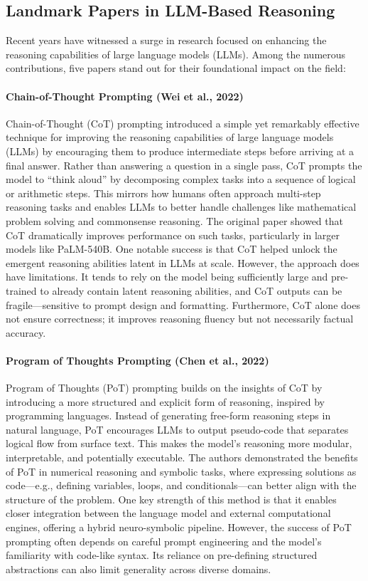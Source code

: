 \subsection{Landmark Papers in LLM-Based Reasoning}

Recent years have witnessed a surge in research focused on enhancing the reasoning capabilities of large language models (LLMs). Among the numerous contributions, five papers stand out for their foundational impact on the field:

\paragraph{Chain-of-Thought Prompting (Wei et al., 2022)}
Chain-of-Thought (CoT) prompting introduced a simple yet remarkably effective technique for improving the reasoning capabilities of large language models (LLMs) by encouraging them to produce intermediate steps before arriving at a final answer. Rather than answering a question in a single pass, CoT prompts the model to “think aloud” by decomposing complex tasks into a sequence of logical or arithmetic steps. This mirrors how humans often approach multi-step reasoning tasks and enables LLMs to better handle challenges like mathematical problem solving and commonsense reasoning. The original paper showed that CoT dramatically improves performance on such tasks, particularly in larger models like PaLM-540B. One notable success is that CoT helped unlock the emergent reasoning abilities latent in LLMs at scale. However, the approach does have limitations. It tends to rely on the model being sufficiently large and pre-trained to already contain latent reasoning abilities, and CoT outputs can be fragile—sensitive to prompt design and formatting. Furthermore, CoT alone does not ensure correctness; it improves reasoning fluency but not necessarily factual accuracy.

\paragraph{Program of Thoughts Prompting (Chen et al., 2022)}
Program of Thoughts (PoT) prompting builds on the insights of CoT by introducing a more structured and explicit form of reasoning, inspired by programming languages. Instead of generating free-form reasoning steps in natural language, PoT encourages LLMs to output pseudo-code that separates logical flow from surface text. This makes the model’s reasoning more modular, interpretable, and potentially executable. The authors demonstrated the benefits of PoT in numerical reasoning and symbolic tasks, where expressing solutions as code—e.g., defining variables, loops, and conditionals—can better align with the structure of the problem. One key strength of this method is that it enables closer integration between the language model and external computational engines, offering a hybrid neuro-symbolic pipeline. However, the success of PoT prompting often depends on careful prompt engineering and the model’s familiarity with code-like syntax. Its reliance on pre-defining structured abstractions can also limit generality across diverse domains.

